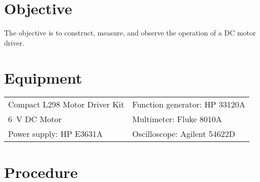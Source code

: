 

\section{Objective}
\label{sec:objective}

The objective is to construct, measure, and observe the operation of a DC motor driver.

\section{Equipment}
\label{sec:equipment}

\begin{tabular}{ll}
  \centering
  Compact L298 Motor Driver Kit & Function generator: HP 33120A \\
  \SI{6}{V} DC Motor            & Multimeter: Fluke 8010A       \\
  Power supply: HP E3631A       & Oscilloscope: Agilent 54622D  \\
\end{tabular}



\section{Procedure}
\label{sec:procedure}

